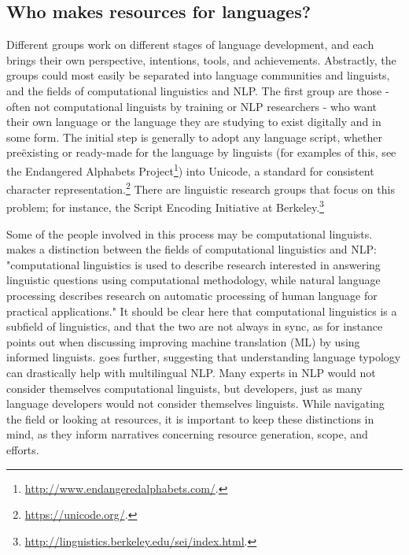 \subsection{Who makes resources for languages?}
\label{subsec:who-makes-resources}

Different groups  work on different stages of language development, and each brings their own perspective, intentions, tools, and achievements. Abstractly, the groups could most easily be separated into language communities and linguists, and the fields of computational linguistics and NLP. The first group are those - often not computational linguists by training or NLP researchers - who want their own language or the language they are studying to exist digitally and in some form. The initial step is generally to adopt any language script, whether  pre\"{e}xisting or ready-made for the language by linguists (for examples of this, see the Endangered Alphabets Project\footnote{\href{http://www.endangeredalphabets.com/}{http://www.endangeredalphabets.com/}. }) into Unicode, a standard for consistent character representation.\footnote{\href{https://unicode.org/}{https://unicode.org/}. } There are linguistic research groups that focus on this problem; for instance, the Script Encoding Initiative at Berkeley.\footnote{\href{http://linguistics.berkeley.edu/sei/index.html}{http://linguistics.berkeley.edu/sei/index.html}. }

Some of the people involved in this process may be computational linguists. \citet{bender2016linguistic} makes a distinction between the fields of computational linguistics and NLP: "computational linguistics is used to describe research interested in answering linguistic questions using computational methodology, while natural language processing describes research on automatic processing of human language for practical applications." It should be clear here that computational linguistics is a subfield of linguistics, and that the two are not always in sync, as for instance \citet{kay1997proper} points out when discussing improving machine translation (ML) by using informed linguists. \citet{bender2010grand, bender2016linguistic} goes further, suggesting that understanding language typology can drastically help with multilingual NLP. Many experts in NLP would not consider themselves computational linguists, but developers, just as many language developers would not consider themselves linguists. While navigating the field or looking at resources, it is important to keep these distinctions in mind, as they inform narratives concerning resource generation, scope, and efforts.


